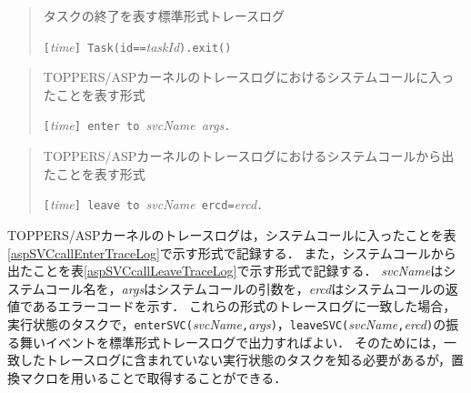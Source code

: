 \begin{table}[p]
\begin{quote}
\caption{タスクの終了を表す標準形式トレースログ}
\label{aspTaskExitTraceLog}
\begin{breakbox}
{\tt [}{\it time}{\tt ] Task(id==}{\it taskId}{\tt ).exit()}
\end{breakbox}
\end{quote}
\end{table}

\begin{table}[p]
\begin{quote}
\caption{TOPPERS/ASPカーネルのトレースログにおけるシステムコールに入ったことを表す形式}
\label{aspSVCcallEnterTraceLog}
\begin{breakbox}
{\tt [}{\it time}{\tt ] enter to }{\it svcName}{\tt \ }{\it args}{\tt .}
\end{breakbox}
\end{quote}
\end{table}

\begin{table}[p]
\begin{quote}
\caption{TOPPERS/ASPカーネルのトレースログにおけるシステムコールから出たことを表す形式}
\label{aspSVCcallLeaveTraceLog}
\begin{breakbox}
{\tt [}{\it time}{\tt ] leave to }{\it svcName}{\tt \ ercd=}{\it ercd}{\tt .}
\end{breakbox}
\end{quote}
\end{table}

TOPPERS/ASPカーネルのトレースログは，システムコールに入ったことを表\ref{aspSVCcallEnterTraceLog}で示す形式で記録する．
また，システムコールから出たことを表\ref{aspSVCcallLeaveTraceLog}で示す形式で記録する．
{\it svcName}はシステムコール名を，{\it args}はシステムコールの引数を，{\it ercd}はシステムコールの返値であるエラーコードを示す．
これらの形式のトレースログに一致した場合，実行状態のタスクで，{\tt enterSVC(}{\it svcName}{\tt ,}{\it args}{\tt )}，{\tt leaveSVC(}{\it svcName}{\tt ,}{\it ercd}{\tt )}の振る舞いイベントを標準形式トレースログで出力すればよい．
そのためには，一致したトレースログに含まれていない実行状態のタスクを知る必要があるが，置換マクロを用いることで取得することができる．

